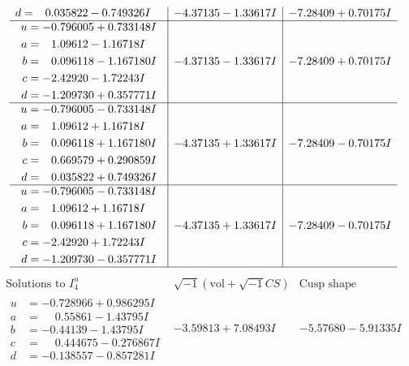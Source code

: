 \documentclass[1p]{elsarticle_modified}
\theoremstyle{definition}
\newcommand{\I}{\sqrt{-1}}
\begin{document}
$$\begin{array}{c|c|c}
\begin{aligned}
d &= \phantom{-}0.035822 - 0.749326 I\end{aligned}
 & -4.37135 - 1.33617 I & -7.28409 + 0.70175 I \\ \hline\begin{aligned}
u &= -0.796005 + 0.733148 I \\
a &= \phantom{-}1.09612 - 1.16718 I \\
b &= \phantom{-}0.096118 - 1.167180 I \\
c &= -2.42920 - 1.72243 I \\
d &= -1.209730 + 0.357771 I\end{aligned}
 & -4.37135 - 1.33617 I & -7.28409 + 0.70175 I \\ \hline\begin{aligned}
u &= -0.796005 - 0.733148 I \\
a &= \phantom{-}1.09612 + 1.16718 I \\
b &= \phantom{-}0.096118 + 1.167180 I \\
c &= \phantom{-}0.669579 + 0.290859 I \\
d &= \phantom{-}0.035822 + 0.749326 I\end{aligned}
 & -4.37135 + 1.33617 I & -7.28409 - 0.70175 I \\ \hline\begin{aligned}
u &= -0.796005 - 0.733148 I \\
a &= \phantom{-}1.09612 + 1.16718 I \\
b &= \phantom{-}0.096118 + 1.167180 I \\
c &= -2.42920 + 1.72243 I \\
d &= -1.209730 - 0.357771 I\end{aligned}
 & -4.37135 + 1.33617 I & -7.28409 - 0.70175 I\\
 \hline 
 \end{array}$$\newpage$$\begin{array}{c|c|c}  
\text{Solutions to }I^u_{4}& \I (\text{vol} + \sqrt{-1}CS) & \text{Cusp shape}\\
 \hline 
\begin{aligned}
u &= -0.728966 + 0.986295 I \\
a &= \phantom{-}0.55861 - 1.43795 I \\
b &= -0.44139 - 1.43795 I \\
c &= \phantom{-}0.444675 - 0.276867 I \\
d &= -0.138557 - 0.857281 I\end{aligned}
 & -3.59813 + 7.08493 I & -5.57680 - 5.91335 I \\ \hline\begin{aligned}

\end{aligned}
\end{array}$$
\end{document}
